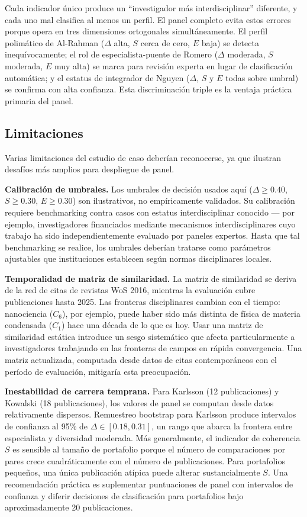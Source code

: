 \documentclass[
]{article}
\begin{document}
Cada indicador único produce un ``investigador más interdisciplinar''
diferente, y cada uno mal clasifica al menos un perfil. El panel
completo evita estos errores porque opera en tres dimensiones
ortogonales simultáneamente. El perfil polimático de Al-Rahman
(\(\Delta\) alta, \(S\) cerca de cero, \(E\) baja) se detecta
inequívocamente; el rol de especialista-puente de Romero (\(\Delta\)
moderada, \(S\) moderada, \(E\) muy alta) se marca para revisión experta
en lugar de clasificación automática; y el estatus de integrador de
Nguyen (\(\Delta\), \(S\) y \(E\) todas sobre umbral) se confirma con
alta confianza. Esta discriminación triple es la ventaja práctica
primaria del panel.

\hypertarget{limitaciones}{%
\subsection{Limitaciones}\label{limitaciones}}

Varias limitaciones del estudio de caso deberían reconocerse, ya que
ilustran desafíos más amplios para despliegue de panel.

\textbf{Calibración de umbrales.} Los umbrales de decisión usados aquí
(\(\Delta \geq 0.40\), \(S \geq 0.30\), \(E \geq 0.30\)) son
ilustrativos, no empíricamente validados. Su calibración requiere
benchmarking contra casos con estatus interdisciplinar conocido --- por
ejemplo, investigadores financiados mediante mecanismos
interdisciplinares cuyo trabajo ha sido independientemente evaluado por
paneles expertos. Hasta que tal benchmarking se realice, los umbrales
deberían tratarse como parámetros ajustables que instituciones
establecen según normas disciplinares locales.

\textbf{Temporalidad de matriz de similaridad.} La matriz de similaridad
se deriva de la red de citas de revistas WoS 2016, mientras la
evaluación cubre publicaciones hasta 2025. Las fronteras disciplinares
cambian con el tiempo: nanociencia (\(C_6\)), por ejemplo, puede haber
sido más distinta de física de materia condensada (\(C_1\)) hace una
década de lo que es hoy. Usar una matriz de similaridad estática
introduce un sesgo sistemático que afecta particularmente a
investigadores trabajando en las fronteras de campos en rápida
convergencia. Una matriz actualizada, computada desde datos de citas
contemporáneos con el período de evaluación, mitigaría esta
preocupación.

\textbf{Inestabilidad de carrera temprana.} Para Karlsson (12
publicaciones) y Kowalski (18 publicaciones), los valores de panel se
computan desde datos relativamente dispersos. Remuestreo bootstrap para
Karlsson produce intervalos de confianza al 95\% de
\(\Delta \in [0.18, 0.31]\), un rango que abarca la frontera entre
especialista y diversidad moderada. Más generalmente, el indicador de
coherencia \(S\) es sensible al tamaño de portafolio porque el número de
comparaciones por pares crece cuadráticamente con el número de
publicaciones. Para portafolios pequeños, una única publicación atípica
puede alterar sustancialmente \(S\). Una recomendación práctica es
suplementar puntuaciones de panel con intervalos de confianza y diferir
decisiones de clasificación para portafolios bajo aproximadamente 20
publicaciones.
\end{document}
